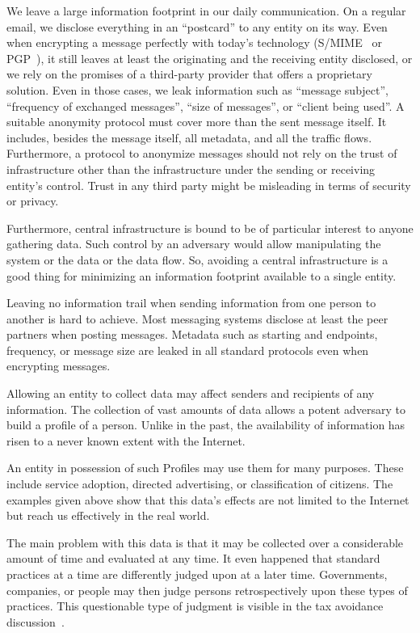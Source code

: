 We leave a large information footprint in our daily communication. On a regular email, we disclose everything in an ``postcard'' to any entity on its way. Even when encrypting a message perfectly with today's technology (S/MIME~\cite{rfc2045} or PGP~\cite{rfc2015}), it still leaves at least the originating and the receiving entity disclosed, or we rely on the promises of a third-party provider that offers a proprietary solution. Even in those cases, we leak information such as ``message subject'', ``frequency of exchanged messages'', ``size of messages'', or ``client being used''. A suitable anonymity protocol must cover more than the sent message itself. It includes, besides the message itself, all metadata, and all the traffic flows. Furthermore, a protocol to anonymize messages should not rely on the trust of infrastructure other than the infrastructure under the sending or receiving entity's control. Trust in any third party might be misleading in terms of security or privacy.

Furthermore, central infrastructure is bound to be of particular interest to anyone gathering data. Such control by an adversary would allow manipulating the system or the data or the data flow. So, avoiding a central infrastructure is a good thing for minimizing an information footprint available to a single entity.

Leaving no information trail when sending information from one person to another is hard to achieve. Most messaging systems disclose at least the peer partners when posting messages. Metadata such as starting and endpoints, frequency, or message size are leaked in all standard protocols even when encrypting messages.

Allowing an entity to collect data may affect senders and recipients of any information. The collection of vast amounts of data allows a potent adversary to build a  profile of a person. Unlike in the past, the availability of information has risen to a never known extent with the Internet.

An entity in possession of such Profiles may use them for many purposes. These include service adoption, directed advertising, or classification of citizens. The examples given above show that this data's effects are not limited to the Internet but reach us effectively in the real world.

The main problem with this data is that it may be collected over a considerable amount of time and evaluated at any time. It even happened that standard practices at a time are differently judged upon at a later time. Governments, companies, or people may then judge persons retrospectively upon these types of practices. This questionable type of judgment is visible in the tax avoidance discussion~\cite{Amat1999}. 

